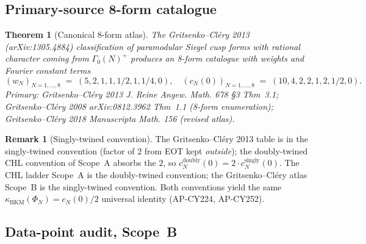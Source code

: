 \documentclass[11pt]{article}
\providecommand{\kBKM}{\kappa_{\mathrm{BKM}}}
\newtheorem{theorem}[lemma]{Theorem}
\theoremstyle{definition}
\newtheorem{remark}[lemma]{Remark}
\begin{document}
\subsection{Primary-source 8-form catalogue}

\begin{theorem}[Canonical 8-form atlas]
\label{thm:canonical-8-form}
The Gritsenko--Cl\'ery 2013 (arXiv:1305.4884) classification of
paramodular Siegel cusp forms with rational character coming from
$\Gamma_0(N)^+$ produces an 8-form catalogue with weights
and Fourier constant terms
\[
  (w_N)_{N = 1, \dots, 8} \;=\;
  (5, 2, 1, 1, 1/2, 1, 1/4, 0),
  \quad
  (c_N(0))_{N = 1, \dots, 8} \;=\;
  (10, 4, 2, 2, 1, 2, 1/2, 0).
\]
Primary: Gritsenko--Cl\'ery 2013 \emph{J. Reine Angew. Math.} 678 \S 3
Thm~3.1; Gritsenko--Cl\'ery 2008 arXiv:0812.3962 Thm~1.1
(8-form enumeration); Gritsenko--Cl\'ery 2018
\emph{Manuscripta Math.} 156 (revised atlas).
\end{theorem}

\begin{remark}[Singly-twined convention]
The Gritsenko--Cl\'ery 2013 table is in the singly-twined convention
(factor of $2$ from EOT kept \emph{outside}); the doubly-twined CHL
convention of Scope~A absorbs the $2$, so
$c_N^{\mathrm{doubly}}(0) = 2 \cdot c_N^{\mathrm{singly}}(0)$.
The CHL ladder Scope~A is the doubly-twined convention; the
Gritsenko--Cl\'ery atlas Scope~B is the singly-twined convention.
Both conventions yield the same $\kBKM(\Phi_N) = c_N(0)/2$ universal
identity (AP-CY224, AP-CY252).
\end{remark}

\subsection{Data-point audit, Scope~B}
\end{document}
